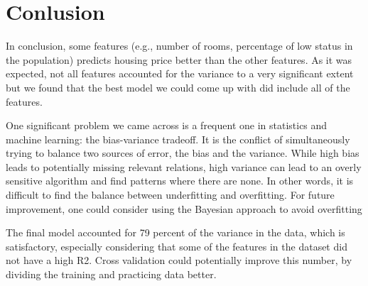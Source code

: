 \documentclass[11pt]{article}
\begin{document}
\section{Conlusion}
In conclusion, some features (e.g., number of rooms, percentage of low status in the population) predicts housing price better than the other features.
As it was expected, not all features accounted for the variance to a very significant extent but we found that the best model we could come up with did include all of the features. 




One significant problem we came across is a frequent one in statistics and machine learning: the bias-variance tradeoff. It is the conflict of simultaneously trying to balance two sources of error, the bias and the variance. While high bias leads to potentially missing relevant relations, high variance can lead to an overly sensitive algorithm and find patterns where there are none. In other words, it is difficult to find the balance between underfitting and overfitting. For future improvement, one could consider using the Bayesian approach to avoid overfitting

The final model accounted for 79 percent of the variance in the data, which is satisfactory, especially considering that some of the features in the dataset did not have a high R2. Cross validation could potentially improve this number, by dividing the training and practicing data better.




\end{document}
